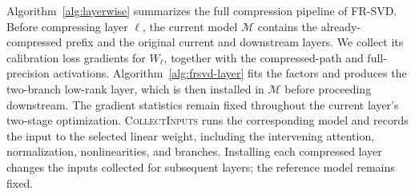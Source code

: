 Algorithm~\ref{alg:layerwise} summarizes the full compression pipeline of FR-SVD. Before compressing layer $\ell$, the current model $\mathcal M$ contains the already-compressed prefix and the original current and downstream layers. We collect its calibration loss gradients for $W_\ell$, together with the compressed-path and full-precision activations. Algorithm~\ref{alg:frsvd-layer} fits the factors and produces the two-branch low-rank layer, which is then installed in $\mathcal M$ before proceeding downstream. The gradient statistics remain fixed throughout the current layer's two-stage optimization. \textsc{CollectInputs} runs the corresponding model and records the input to the selected linear weight, including the intervening attention, normalization, nonlinearities, and branches. Installing each compressed layer changes the inputs collected for subsequent layers; the reference model remains fixed.

